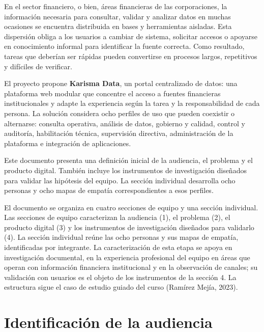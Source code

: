 
En el sector financiero, o bien, áreas financieras de las corporaciones, la información
necesaria para consultar, validar y analizar datos en muchas ocasiones se encuentra
distribuida en bases y herramientas aisladas. Esta dispersión obliga a los usuarios a
cambiar de sistema, solicitar accesos o apoyarse en conocimiento informal para identificar
la fuente correcta. Como resultado, tareas que deberían ser rápidas pueden convertirse en
procesos largos, repetitivos y difíciles de verificar.

El proyecto propone \textbf{Karisma Data}, un portal centralizado de datos: una plataforma web
modular que concentre el acceso a fuentes financieras institucionales y adapte la experiencia
según la tarea y la responsabilidad de cada persona. La solución considera ocho perfiles de uso que
pueden coexistir o alternarse: consulta operativa, análisis de datos, gobierno y calidad,
control y auditoría, habilitación técnica, supervisión directiva, administración de la
plataforma e integración de aplicaciones.

Este documento presenta una definición inicial de la audiencia, el problema y el producto
digital. También incluye los instrumentos de investigación diseñados para validar las
hipótesis del equipo. La sección individual desarrolla ocho personas y ocho mapas de
empatía correspondientes a esos perfiles.

El documento se organiza en cuatro secciones de equipo y una sección individual. Las
secciones de equipo caracterizan la audiencia (1), el problema (2), el producto digital (3)
y los instrumentos de investigación diseñados para validarlo (4). La sección individual
reúne las ocho personas y sus mapas de empatía, identificadas por integrante. La
caracterización de esta etapa se apoya en investigación documental, en la experiencia
profesional del equipo en áreas que operan con información financiera institucional y en la
observación de canales; su validación con usuarios es el objeto de los instrumentos de la
sección 4. La estructura sigue el caso de estudio guiado del curso (Ramírez Mejía, 2023).

\section{Identificación de la audiencia}

